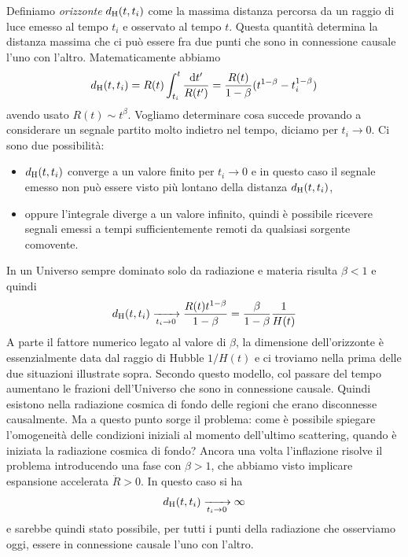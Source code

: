 Definiamo \emph{orizzonte} \(d_{\textup{H}}(t,t_{i})\) come la massima distanza
percorsa da un raggio di luce emesso al tempo \(t_{i}\) e osservato al tempo
\(t\).  Questa quantità determina la distanza massima che ci può essere fra due
punti che sono in connessione causale l'uno con l'altro.  Matematicamente
abbiamo
\begin{equation}
  d_{\textup{H}}(t, t_{i}) = R(t)\int_{t_{i}}^{t} \frac{\mathop{}\!\mathrm{d} t'}{R(t')} =
  \frac{R(t)}{1-\beta}(t^{1-\beta} - t_{i}^{1-\beta})
\end{equation}
avendo usato \(R(t)\sim t^{\beta}\).  Vogliamo determinare cosa succede provando
a considerare un segnale partito molto indietro nel tempo, diciamo per \(t_{i}
\to 0\).  Ci sono due possibilità:
\begin{itemize}
\item \(d_{\textup{H}}(t, t_{i})\) converge a un valore finito per \(t_{i} \to
  0\) e in questo caso il segnale emesso non può essere visto più lontano della
  distanza \(d_{\textup{H}}(t, t_{i})\),
\item oppure l'integrale diverge a un valore infinito, quindi è possibile
  ricevere segnali emessi a tempi sufficientemente remoti da qualsiasi sorgente
  comovente.
\end{itemize}
In un Universo sempre dominato solo da radiazione e materia risulta \(\beta<1\)
e quindi
\begin{equation}
  d_{\textup{H}}(t, t_{i}) \xrightarrow[t_{i}\to 0]{} \frac{R(t)
    t^{1-\beta}}{1-\beta} = \frac{\beta}{1-\beta} \frac{1}{H(t)}
\end{equation}
A parte il fattore numerico legato al valore di \(\beta\), la dimensione
dell'orizzonte è essenzialmente data dal raggio di Hubble \(1/H(t)\) e ci
troviamo nella prima delle due situazioni illustrate sopra.  Secondo questo
modello, col passare del tempo aumentano le frazioni dell'Universo che sono in
connessione causale.  Quindi esistono nella radiazione cosmica di fondo delle
regioni che erano disconnesse causalmente.  Ma a questo punto sorge il problema:
come è possibile spiegare l'omogeneità delle condizioni iniziali al momento
dell'ultimo scattering, quando è iniziata la radiazione cosmica di fondo?
Ancora una volta l'inflazione risolve il problema introducendo una fase con
\(\beta>1\), che abbiamo visto implicare espansione accelerata \(\ddot{R}>0\).
In questo caso si ha
\begin{equation}
  d_{\textup{H}}(t, t_{i}) \xrightarrow[t_{i}\to 0]{} \infty
\end{equation}
e sarebbe quindi stato possibile, per tutti i punti della radiazione che
osserviamo oggi, essere in connessione causale l'uno con l'altro.


